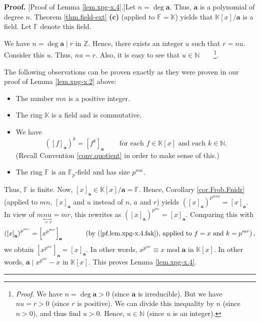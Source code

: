 \documentclass[numbers=enddot,12pt,final,onecolumn,notitlepage]{scrartcl}%
\theoremstyle{definition}
\newenvironment{proof}[1][Proof]{\noindent\textbf{#1.} }{\ \rule{0.5em}{0.5em}}
\begin{document}
\begin{proof}
[Proof of Lemma \ref{lem.xpg-x.4}.]Let $n=\deg\mathbf{a}$. Thus, $\mathbf{a}$
is a polynomial of degree $n$. Theorem \ref{thm.field-ext} \textbf{(c)}
(applied to $\mathbb{F}=\mathbb{K}$) yields that $\mathbb{K}\left[  x\right]
/\mathbf{a}$ is a field. Let $\mathbb{F}$ denote this field.

We have $n=\deg\mathbf{a}\mid r$ in $\mathbb{Z}$. Hence, there exists an
integer $u$ such that $r=nu$. Consider this $u$. Thus, $nu=r$. Also, it is
easy to see that $u\in\mathbb{N}$\ \ \ \ \footnote{\textit{Proof.} We have
$n=\deg\mathbf{a}>0$ (since $\mathbf{a}$ is irreducible). But we have $nu=r>0$
(since $r$ is positive). We can divide this inequality by $n$ (since $n>0$),
and thus find $u>0$. Hence, $u\in\mathbb{N}$ (since $u$ is an integer).}.

The following observations can be proven exactly as they were proven in our
proof of Lemma \ref{lem.xpg-x.2} above:

\begin{itemize}
\item The number $mn$ is a positive integer.

\item The ring $\mathbb{K}$ is a field and is commutative.

\item We have
\begin{equation}
\left(  \left[  f\right]  _{\mathbf{a}}\right)  ^{k}=\left[  f^{k}\right]
_{\mathbf{a}}\ \ \ \ \ \ \ \ \ \ \text{for each }f\in\mathbb{K}\left[
x\right]  \text{ and each }k\in\mathbb{N}. \label{pf.lem.xpg-x.4.fak}%
\end{equation}
(Recall Convention \ref{conv.quotient} in order to make sense of this.)

\item The ring $\mathbb{F}$ is an $\mathbb{F}_{p}$-field and has size $p^{mn}$.
\end{itemize}

Thus, $\mathbb{F}$ is finite. Now, $\left[  x\right]  _{\mathbf{a}}%
\in\mathbb{K}\left[  x\right]  /\mathbf{a}=\mathbb{F}$. Hence, Corollary
\ref{cor.Frob.Fnidr} (applied to $mn$, $\left[  x\right]  _{\mathbf{a}}$ and
$u$ instead of $n$, $a$ and $r$) yields $\left(  \left[  x\right]
_{\mathbf{a}}\right)  ^{p^{mnu}}=\left[  x\right]  _{\mathbf{a}}$. In view of
$m\underbrace{nu}_{=r}=mr$, this rewrites as $\left(  \left[  x\right]
_{\mathbf{a}}\right)  ^{p^{mr}}=\left[  x\right]  _{\mathbf{a}}$. Comparing
this with%
\[
\left(  \left[  x\right]  _{\mathbf{a}}\right)  ^{p^{mr}}=\left[  x^{p^{mr}%
}\right]  _{\mathbf{a}}\ \ \ \ \ \ \ \ \ \ \left(  \text{by
(\ref{pf.lem.xpg-x.4.fak}), applied to }f=x\text{ and }k=p^{mr}\right)  ,
\]
we obtain $\left[  x^{p^{mr}}\right]  _{\mathbf{a}}=\left[  x\right]
_{\mathbf{a}}$. In other words, $x^{p^{mr}}\equiv x\operatorname{mod}%
\mathbf{a}$ in $\mathbb{K}\left[  x\right]  $. In other words, $\mathbf{a}\mid
x^{p^{mr}}-x$ in $\mathbb{K}\left[  x\right]  $. This proves Lemma
\ref{lem.xpg-x.4}.
\end{proof}
\end{document}
